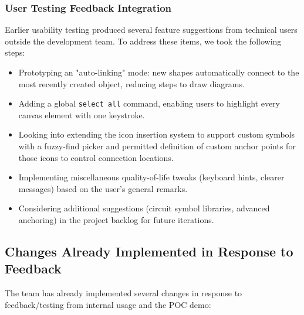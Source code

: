 \documentclass[12pt, titlepage]{article}
\begin{document}
\subsubsection{User Testing Feedback Integration}
Earlier usability testing produced several feature suggestions from
technical users outside the development team. To address these items,
we took the following steps:

\begin{itemize}
\item Prototyping an "auto-linking" mode: new shapes automatically connect to
  the most recently created object, reducing steps to draw diagrams.

\item Adding a global \texttt{select all} command, enabling users to
  highlight every canvas element with one keystroke.

\item Looking into extending the icon insertion system to support custom
  symbols with a fuzzy-find picker and permitted definition of custom
  anchor points for those icons to control connection locations.

\item Implementing miscellaneous quality-of-life tweaks (keyboard hints,
  clearer messages) based on the user's general remarks.

\item Considering additional suggestions (circuit symbol libraries, advanced
  anchoring) in the project backlog for future iterations.
\end{itemize}

\subsection{Changes Already Implemented in Response to Feedback}
The team has already implemented several changes in response to feedback/testing
from internal usage and the POC demo:
\end{document}
